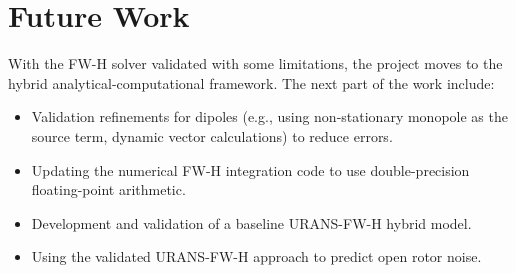 
\chapter{Future Work}
With the FW-H solver validated with some limitations, the project moves to the hybrid analytical-computational framework. The next part of the work include:

\begin{itemize}
    \item Validation refinements for dipoles (e.g., using non-stationary monopole as the source term, dynamic vector calculations) to reduce errors.
    \item Updating the numerical FW-H integration code to use double-precision floating-point arithmetic.
    \item Development and validation of a baseline URANS-FW-H hybrid model.
    \item Using the validated URANS-FW-H approach to predict open rotor noise.
\end{itemize}